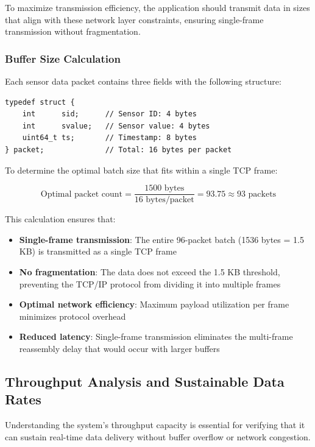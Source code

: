 To maximize transmission efficiency, the application should transmit data in sizes that align with these network layer constraints, ensuring single-frame transmission without fragmentation.

\subsubsection{Buffer Size Calculation}

Each sensor data packet contains three fields with the following structure:

\begin{verbatim}
typedef struct {
    int      sid;      // Sensor ID: 4 bytes
    int      svalue;   // Sensor value: 4 bytes
    uint64_t ts;       // Timestamp: 8 bytes
} packet;              // Total: 16 bytes per packet
\end{verbatim}

To determine the optimal batch size that fits within a single TCP frame:

\[
\text{Optimal packet count} = \frac{1500 \text{ bytes}}{16 \text{ bytes/packet}} = 93.75 \approx 93 \text{ packets}
\]

This calculation ensures that:

\begin{itemize}
    \item \textbf{Single-frame transmission}: The entire 96-packet batch (1536 bytes = 1.5 KB) is transmitted as a single TCP frame
    \item \textbf{No fragmentation}: The data does not exceed the 1.5 KB threshold, preventing the TCP/IP protocol from dividing it into multiple frames
    \item \textbf{Optimal network efficiency}: Maximum payload utilization per frame minimizes protocol overhead
    \item \textbf{Reduced latency}: Single-frame transmission eliminates the multi-frame reassembly delay that would occur with larger buffers
\end{itemize}

\subsection{Throughput Analysis and Sustainable Data Rates}

Understanding the system's throughput capacity is essential for verifying that it can sustain real-time data delivery without buffer overflow or network congestion.

